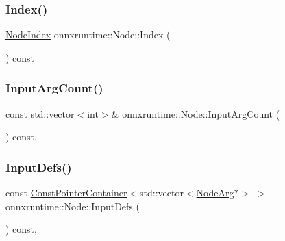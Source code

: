 \mbox{\label{classonnxruntime_1_1Node_afe7de845bf52c5fcad7f3eee224fa5b8}} 
\subsubsection{\texorpdfstring{Index()}{Index()}}
{\footnotesize\ttfamily \mbox{\hyperlink{namespaceonnxruntime_af8773b5c12b5d8fd9292eb2e268df760}{Node\+Index}} onnxruntime\+::\+Node\+::\+Index (\begin{DoxyParamCaption}{ }\end{DoxyParamCaption}) const\hspace{0.3cm}{\ttfamily [noexcept]}}

\mbox{\label{classonnxruntime_1_1Node_a029f57f45c28c271b0a4f3edd6824f81}} 
\subsubsection{\texorpdfstring{Input\+Arg\+Count()}{InputArgCount()}}
{\footnotesize\ttfamily const std\+::vector$<$int$>$\& onnxruntime\+::\+Node\+::\+Input\+Arg\+Count (\begin{DoxyParamCaption}{ }\end{DoxyParamCaption}) const\hspace{0.3cm}{\ttfamily [inline]}, {\ttfamily [noexcept]}}

\mbox{\label{classonnxruntime_1_1Node_a8f6a801fc3cdc6efdb09f31a242e3f45}} 
\subsubsection{\texorpdfstring{Input\+Defs()}{InputDefs()}}
{\footnotesize\ttfamily const \mbox{\hyperlink{classonnxruntime_1_1ConstPointerContainer}{Const\+Pointer\+Container}}$<$std\+::vector$<$\mbox{\hyperlink{classonnxruntime_1_1NodeArg}{Node\+Arg}}$\ast$$>$ $>$ onnxruntime\+::\+Node\+::\+Input\+Defs (\begin{DoxyParamCaption}{ }\end{DoxyParamCaption}) const\hspace{0.3cm}{\ttfamily [inline]}, {\ttfamily [noexcept]}}

